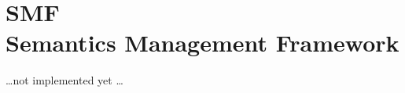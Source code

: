 \chapter[Semantics Management Framework]{SMF\\\normalsize{Semantics Management Framework}}

\dots not implemented yet \dots
